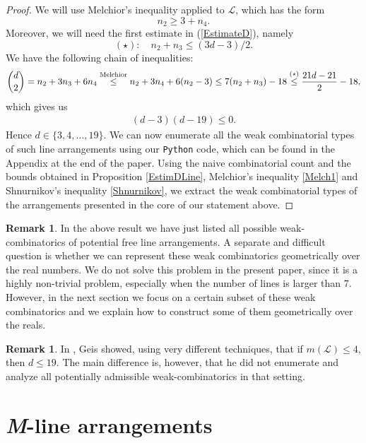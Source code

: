 \documentclass[12pt]{article}
\theoremstyle{plain}
\theoremstyle{definition}
\newtheorem{remark}[thm]{Remark}
\begin{document}
\begin{proof}
We will use Melchior's inequality applied to $\mathcal{L}$, which has the form
\begin{equation}
\label{Melch1}
n_2\geq 3 + n_4.
\end{equation}
Moreover, we will need the first estimate in (\ref{EstimateD}), namely
$$(\star) : \quad n_{2} + n_{3}\leq (3d-3)/2.$$ We have the following chain of inequalities:
\begin{align*}
\binom{d}{2} = n_{2} + 3n_{3}+6n_{4} \stackrel{{\rm Melchior}}{\leq}n_{2} + 3n_{4} + 6(n_{2}-3) \leq 7(n_{2}+n_{3})-18 \stackrel{(\star)}{\leq}\dfrac{21d-21}{2}-18,
\end{align*}
which gives us
\begin{align*}
(d-3)(d-19)\leq 0.
\end{align*}
Hence $d \in \{3,4, \ldots, 19\}$.
We can now enumerate all the weak combinatorial types of such line arrangements using our \verb}Python} code, which can be found in the Appendix at the end of the paper. Using the naive combinatorial count and the bounds obtained in Proposition \ref{EstimDLine}, Melchior's inequality \eqref{Melch1} and Shnurnikov's inequality \eqref{Shnurnikov}, we extract the weak combinatorial types of the arrangements presented in the core of our statement above.
\end{proof}
\begin{remark}
In the above result we have just listed all possible weak-combinatorics of potential free line arrangements. A separate and difficult question is whether we can represent these weak combinatorics geometrically over the real numbers. We do not solve this problem in the present paper, since it is a highly non-trivial problem, especially when the number of lines is larger than $7$. However, in the next section we focus on a certain subset of these weak combinatorics and we explain how to construct some of them geometrically over the reals.
\end{remark}
\begin{remark}
In \cite{Geis}, Geis showed, using very different techniques, that if $m(\mathcal{L})\leq 4$, then $d\leq 19$. The main difference is, however, that he did not enumerate and analyze all potentially admissible weak-combinatorics in that setting.
\end{remark}
\section{{\it M}-line arrangements}
\end{document}
